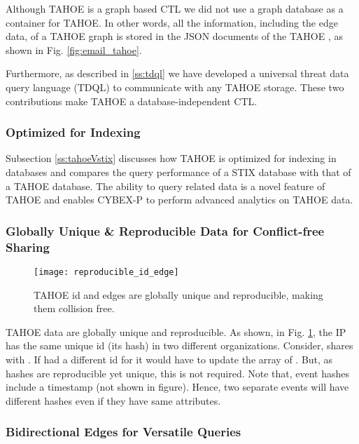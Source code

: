 
Although TAHOE is a graph based CTL we did not use a graph database as a container for TAHOE. In other words, all the information, including the edge data, of a TAHOE graph is stored in the JSON documents of the TAHOE , as shown in Fig. \ref{fig:email_tahoe}.

Furthermore, as described in \ref{ss:tdql} we have developed a universal threat data query language (TDQL) to communicate with any TAHOE storage. These two contributions make TAHOE a database-independent CTL.


\subsubsection{\textbf{Optimized for Indexing}}\label{sss:idx}

Subsection \ref{ss:tahoeVstix} discusses how TAHOE is optimized for indexing in databases and compares the query performance of a STIX database with that of a TAHOE database. The ability to query related data is a novel feature of TAHOE and enables CYBEX-P to perform advanced analytics on TAHOE data.


\subsubsection{\textbf{Globally Unique \& Reproducible Data for Conflict-free Sharing}}

\begin{figure}[ht]
	\texttt{[image: reproducible\_id\_edge]}
	\centering
	\caption{TAHOE id and edges are globally unique and reproducible, making them collision free.}
	\label{fig:repedge}
\end{figure}

TAHOE data are globally unique and reproducible. As shown, in Fig. \ref{fig:repedge}, the IP  has the same unique id (its hash) in two different organizations. Consider,  shares  with . If  had a different id for  it would have to update the  array of . But, as hashes are reproducible yet unique, this is not required. Note that, event hashes include a timestamp (not shown in figure). Hence, two separate events will have different hashes even if they have same attributes.


\subsubsection{\textbf{Bidirectional Edges for Versatile Queries}}\label{sss:biq}

